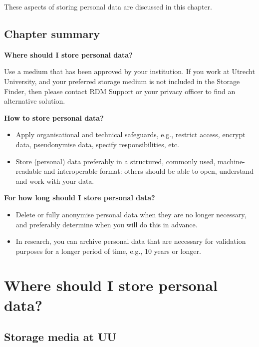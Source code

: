 \documentclass[
]{book}
\providecommand{\tightlist}{%
  \setlength{\itemsep}{0pt}\setlength{\parskip}{0pt}}
\begin{document}
These aspects of storing personal data are discussed in this chapter.

\hypertarget{chapter-summary-1}{%
\subsection{Chapter summary}\label{chapter-summary-1}}

\textbf{Where should I store personal data?}

Use a medium that has been approved by your institution. If you work at Utrecht
University, and your preferred storage medium is not included in the
Storage Finder,
then please contact
RDM Support
or your privacy officer
to find an alternative solution.

\textbf{How to store personal data?}

\begin{itemize}
\tightlist
\item
  Apply organisational and technical safeguards,
  e.g., restrict access, encrypt data, pseudonymise data, specify responsibilities, etc.
\item
  Store (personal) data preferably in a structured, commonly used, machine-readable
  and interoperable format: others should be able to open, understand and work
  with your data.
\end{itemize}

\textbf{For how long should I store personal data?}

\begin{itemize}
\tightlist
\item
  Delete or fully anonymise personal data when they are no longer necessary,
  and preferably determine when you will do this in advance.
\item
  In research, you can archive personal data that are necessary for validation
  purposes for a longer period of time, e.g., 10 years or longer.
\end{itemize}

\hypertarget{data-storage-where}{%
\section{Where should I store personal data?}\label{data-storage-where}}

\hypertarget{storage-media-at-uu}{%
\subsection{Storage media at UU}\label{storage-media-at-uu}}
\end{document}

